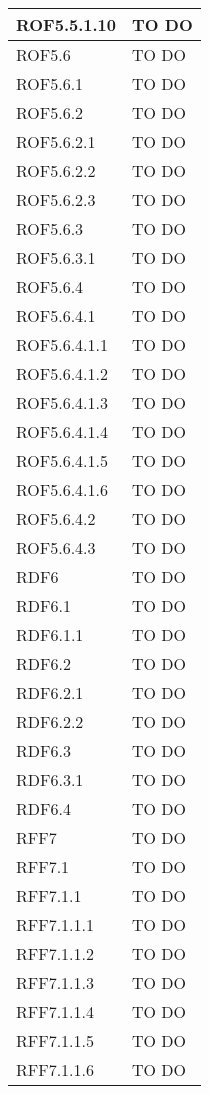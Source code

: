 \begin{center}
\begin{longtable}{| p{4cm} | p{8cm} |}
\hline
ROF5.5.1.10   &  TO DO \\
\hline
ROF5.6   &  TO DO \\
\hline
ROF5.6.1   &  TO DO \\
\hline
ROF5.6.2   &  TO DO \\
\hline
ROF5.6.2.1   &  TO DO \\
\hline
ROF5.6.2.2   &  TO DO \\
\hline
ROF5.6.2.3   &  TO DO \\
\hline
ROF5.6.3   &  TO DO \\
\hline
ROF5.6.3.1   &  TO DO \\
\hline
ROF5.6.4   &  TO DO \\
\hline
ROF5.6.4.1   &  TO DO \\
\hline
ROF5.6.4.1.1   &  TO DO \\
\hline
ROF5.6.4.1.2   &  TO DO \\
\hline
ROF5.6.4.1.3   &  TO DO \\
\hline
ROF5.6.4.1.4   &  TO DO \\
\hline
ROF5.6.4.1.5   &  TO DO \\
\hline
ROF5.6.4.1.6   &  TO DO \\
\hline
ROF5.6.4.2   &  TO DO \\
\hline
ROF5.6.4.3   &  TO DO \\
\hline
RDF6   &  TO DO \\
\hline
RDF6.1   &  TO DO \\
\hline
RDF6.1.1   &  TO DO \\
\hline
RDF6.2   &  TO DO \\
\hline
RDF6.2.1   &  TO DO \\
\hline
RDF6.2.2   &  TO DO \\
\hline
RDF6.3   &  TO DO \\
\hline
RDF6.3.1   &  TO DO \\
\hline
RDF6.4   &  TO DO \\
\hline
RFF7   &  TO DO \\
\hline
RFF7.1   &  TO DO \\
\hline
RFF7.1.1   &  TO DO \\
\hline
RFF7.1.1.1   &  TO DO \\
\hline
RFF7.1.1.2   &  TO DO \\
\hline
RFF7.1.1.3   &  TO DO \\
\hline
RFF7.1.1.4   &  TO DO \\
\hline
RFF7.1.1.5   &  TO DO \\
\hline
RFF7.1.1.6   &  TO DO \\

\end{longtable}
\end{center}
